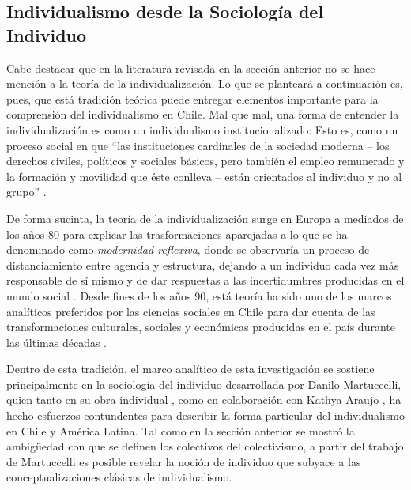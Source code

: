 \documentclass[12pt,twoside]{templates/facsothesis}
\begin{document}
\hypertarget{individualismo-desde-la-sociologuxeda-del-individuo}{%
\subsection{Individualismo desde la Sociología del Individuo}\label{individualismo-desde-la-sociologuxeda-del-individuo}}

Cabe destacar que en la literatura revisada en la sección anterior no se hace mención a la teoría de la individualización. Lo que se planteará a continuación es, pues, que está tradición teórica puede entregar elementos importante para la comprensión del individualismo en Chile. Mal que mal, una forma de entender la individualización es como un individualismo institucionalizado: Esto es, como un proceso social en que ``las instituciones cardinales de la sociedad moderna -- los derechos civiles, políticos y sociales básicos, pero también el empleo remunerado y la formación y movilidad que éste conlleva -- están orientados al individuo y no al grupo'' \citep[p.~32]{beck2003}.

De forma sucinta, la teoría de la individualización surge en Europa a mediados de los años 80 para explicar las trasformaciones aparejadas a lo que se ha denominado como \emph{modernidad reflexiva}, donde se observaría un proceso de distanciamiento entre agencia y estructura, dejando a un individuo cada vez más responsable de sí mismo y de dar respuestas a las incertidumbres producidas en el mundo social \citep{beck2003}. Desde fines de los años 90, está teoría ha sido uno de los marcos analíticos preferidos por las ciencias sociales en Chile para dar cuenta de las transformaciones culturales, sociales y económicas producidas en el país durante las últimas décadas \citep{yopo2013}.

Dentro de esta tradición, el marco analítico de esta investigación se sostiene principalmente en la sociología del individuo desarrollada por Danilo Martuccelli, quien tanto en su obra individual \citetext{\citeyear{martuccelli2010}; \citeyear{martuccelli2018}}, como en colaboración con Kathya Araujo \citetext{\citeyear{araujo2014}; \citeyear{araujo2020}; \citeyear{araujo2012}}, ha hecho esfuerzos contundentes para describir la forma particular del individualismo en Chile y América Latina. Tal como en la sección anterior se mostró la ambigüedad con que se definen los colectivos del colectivismo, a partir del trabajo de Martuccelli es posible revelar la noción de individuo que subyace a las conceptualizaciones clásicas de individualismo.
\end{document}

